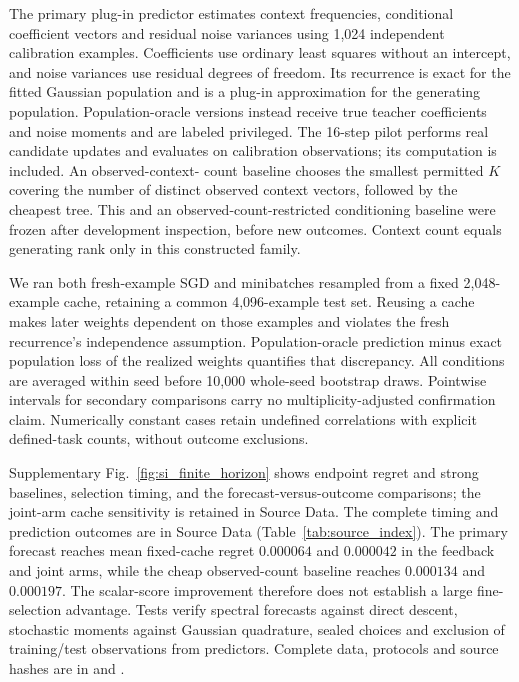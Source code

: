 The primary plug-in predictor estimates context frequencies, conditional
coefficient vectors and residual noise variances using 1,024 independent
calibration examples. Coefficients use ordinary least squares without an
intercept, and noise variances use residual degrees of freedom. Its recurrence
is exact for the fitted Gaussian population and is a plug-in approximation
for the generating population. Population-oracle versions instead receive
true teacher coefficients and noise moments and are labeled privileged.
The 16-step pilot performs real candidate updates and evaluates on
calibration observations; its computation is included. An observed-context-
count baseline chooses the smallest permitted $K$ covering the number of
distinct observed context vectors, followed by the cheapest tree. This and an observed-count-restricted conditioning baseline were frozen after development inspection, before new outcomes. Context count equals generating rank only in this constructed family.

We ran both fresh-example SGD and minibatches resampled from a fixed
2,048-example cache, retaining a common 4,096-example test set. Reusing a
cache makes later weights dependent on those examples and violates the fresh
recurrence's independence assumption. Population-oracle prediction minus
exact population loss of the realized weights quantifies that discrepancy.
All conditions are averaged within seed before 10,000 whole-seed bootstrap draws. Pointwise intervals for secondary comparisons carry no multiplicity-adjusted confirmation claim. Numerically constant cases retain undefined correlations with explicit defined-task counts, without outcome exclusions.

Supplementary Fig.~\ref{fig:si_finite_horizon} shows endpoint
regret and strong baselines, selection timing, and the forecast-versus-outcome
comparisons; the joint-arm cache sensitivity is retained in Source Data.
The complete timing and prediction outcomes are in Source Data (Table~\ref{tab:source_index}). The primary forecast reaches mean fixed-cache
regret $0.000064$ and $0.000042$ in the feedback and joint arms, while the
cheap observed-count baseline reaches $0.000134$ and $0.000197$. The scalar-score improvement therefore does not establish a large fine-selection advantage. Tests verify spectral forecasts against direct descent, stochastic moments against Gaussian quadrature, sealed choices and exclusion of training/test observations from predictors. Complete data, protocols and source hashes are in
 and
.
